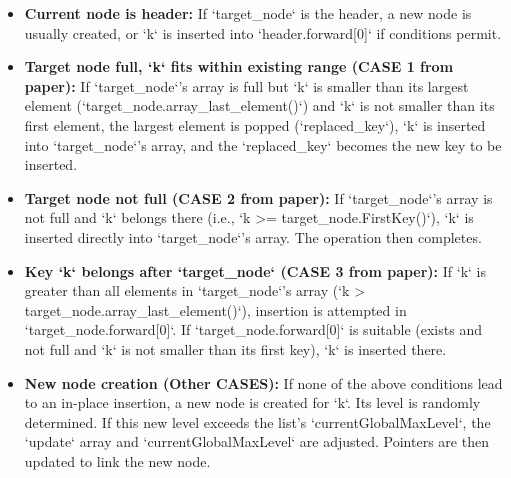 \documentclass{article}
\begin{document}
\begin{itemize}
    \item \textbf{Current node is header:} If `target_node` is the header, a new node is usually created, or `k` is inserted into `header.forward[0]` if conditions permit.
    \item \textbf{Target node full, `k` fits within existing range (CASE 1 from paper):} If `target_node`'s array is full but `k` is smaller than its largest element (`target_node.array_last_element()`) and `k` is not smaller than its first element, the largest element is popped (`replaced_key`), `k` is inserted into `target_node`'s array, and the `replaced_key` becomes the new key to be inserted.
    \item \textbf{Target node not full (CASE 2 from paper):} If `target_node`'s array is not full and `k` belongs there (i.e., `k >= target_node.FirstKey()`), `k` is inserted directly into `target_node`'s array. The operation then completes.
    \item \textbf{Key `k` belongs after `target_node` (CASE 3 from paper):} If `k` is greater than all elements in `target_node`'s array (`k > target_node.array_last_element()`), insertion is attempted in `target_node.forward[0]`. If `target_node.forward[0]` is suitable (exists and not full and `k` is not smaller than its first key), `k` is inserted there.
    \item \textbf{New node creation (Other CASES):} If none of the above conditions lead to an in-place insertion, a new node is created for `k`. Its level is randomly determined. If this new level exceeds the list's `currentGlobalMaxLevel`, the `update` array and `currentGlobalMaxLevel` are adjusted. Pointers are then updated to link the new node.
\end{itemize}
\end{document}
